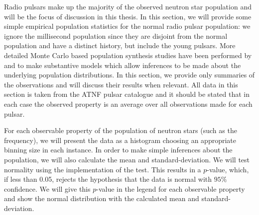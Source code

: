 Radio pulsars make up the majority of the observed neutron star population and
will be the focus of discussion in this thesis. In this section, we will
provide some simple empirical population statistics for the normal radio pulsar
population: we ignore the millisecond population since they are disjoint from
the normal population and have a distinct history, but include the young
pulsars. More detailed Monte Carlo based population synthesis studies have been
performed by \citet{faucher2006birth} and \citet{popov2010population} to make
substantive models which allow inferences to be made about the underlying
population distributions. In this section, we provide only summaries of the
observations and will discuss their results when relevant.  All data in this
section is taken from the ATNF pulsar catalogue \citet{ATNF} and it should be
stated that in each case the observed property is an average over all
observations made for each pulsar.

For each observable property of the population of neutron stars (such as the
frequency), we will present the data as a histogram choosing an appropriate
binning size in each instance. In order to make simple inferences about the
population, we will also calculate the mean and standard-deviation.
We will test normality using the \citet{Scipy} implementation of the
\citet{d1971omnibus} test. This results in a $p$-value, which, if less than
0.05, rejects the hypothesis that the data is normal with $95\%$ confidence. We
will give this $p$-value in the legend for each observable property and show
the normal distribution with the calculated mean and standard-deviation.


